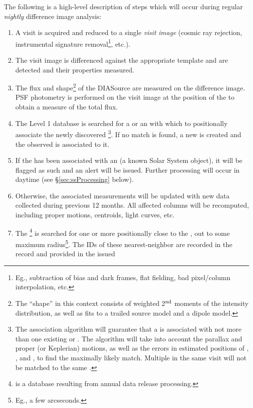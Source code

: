 The following is a high-level description of steps which will occur during regular {\em nightly} 
difference image analysis:
\begin{enumerate}
\item A visit is acquired and reduced to a single {\em visit image} (cosmic ray rejection, instrumental signature removal\footnote{Eg., subtraction of bias and dark frames, flat fielding, bad pixel/column interpolation, etc.}, etc.).
\item The visit image is differenced against the appropriate template and \DIASources are detected and
their properties measured. 
\item The flux and shape\footnote{The ``shape'' in this context consists of weighted 2$^{\rm nd}$ moments
of the intensity distribution, as well as fits to a trailed source model and a dipole model.} of the DIASource are measured on the difference image. PSF photometry is performed on the visit image at the position of the \DIASource to obtain a measure of the total flux.
\item The Level 1 database is searched for a \DIAObject or an \SSObject with which to positionally associate the newly discovered \DIASource\footnote{The association algorithm will guarantee that a \DIASource is associated with not more than one existing \DIAObject or \SSObject. The algorithm will take into account the parallax and proper (or Keplerian) motions, as well as the errors in estimated positions of \DIAObject, \SSObject, and \DIASource, to find the maximally likely match. Multiple \DIASources in the same visit will not be matched to the same \DIAObject.}. If no match is found, a new \DIAObject is created and the observed \DIASource is associated to it.
\item If the \DIASource has been associated with an \SSObject (a known Solar System object), it will be flagged as such and an alert will be issued. Further processing will occur in daytime (see \S\ref{sec:ssProcessing} below).
\item Otherwise, the associated \DIAObject measurements will be updated with new data 
collected during previous 12 months. All affected columns will be recomputed, including proper motions, centroids, light curves, etc.
\item The \DR\footnote{\DR is a database resulting from annual data release processing.} is searched for one or more \Objects positionally close to the \DIAObject, out to some maximum radius\footnote{Eg., a few arcseconds.}. The IDs of these nearest-neighbor \Objects are recorded in the \DIAObject record and provided in the issued 

\end{enumerate}
